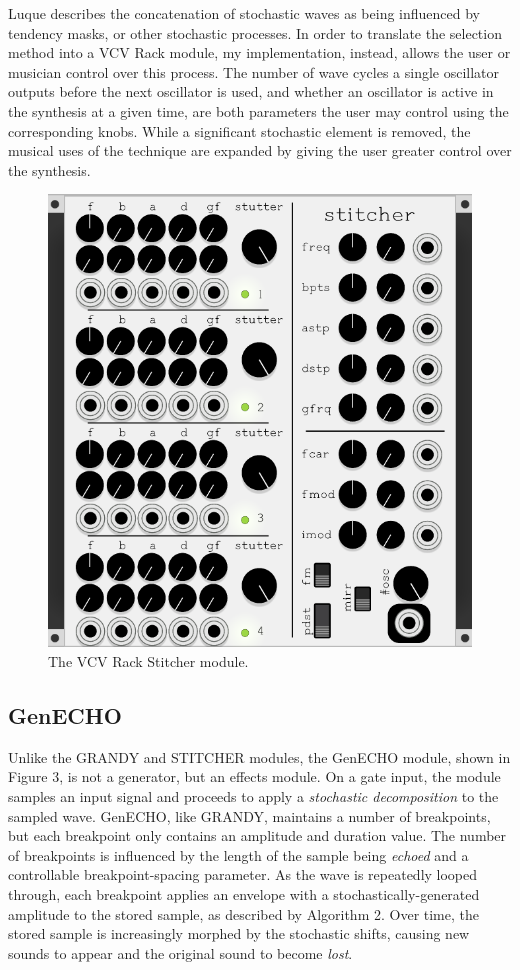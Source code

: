 \documentclass[10pt]{article}
\begin{document}
Luque describes the concatenation of stochastic waves as being influenced by tendency masks, or other stochastic processes.\citep{sergio2006} In order to translate the selection method into a VCV Rack module, my implementation, instead, allows the user or musician control over this process. The number of wave cycles a single oscillator outputs before the next oscillator is used, and whether an oscillator is active in the synthesis at a given time, are both parameters the user may control using the corresponding knobs. While a significant stochastic element is removed, the musical uses of the technique are expanded by giving the user greater control over the synthesis.

\begin{figure}
  \caption{The VCV Rack Stitcher module.}
  \centering
    \includegraphics[height=0.25\textheight]{stitcher}
\end{figure}

\subsection{GenECHO}
Unlike the GRANDY and STITCHER modules, the GenECHO module, shown in Figure 3, is not a generator, but an effects module. On a gate input, the module samples an input signal and proceeds to apply a \textit{stochastic decomposition} to the sampled wave. GenECHO, like GRANDY, maintains a number of breakpoints, but each breakpoint only contains an amplitude and duration value. The number of breakpoints is influenced by the length of the sample being \textit{echoed} and a controllable breakpoint-spacing parameter. As the wave is repeatedly looped through, each breakpoint applies an envelope with a stochastically-generated amplitude to the stored sample, as described by Algorithm 2. Over time, the stored sample is increasingly morphed by the stochastic shifts, causing new sounds to appear and the original sound to become \textit{lost}.
\end{document}
